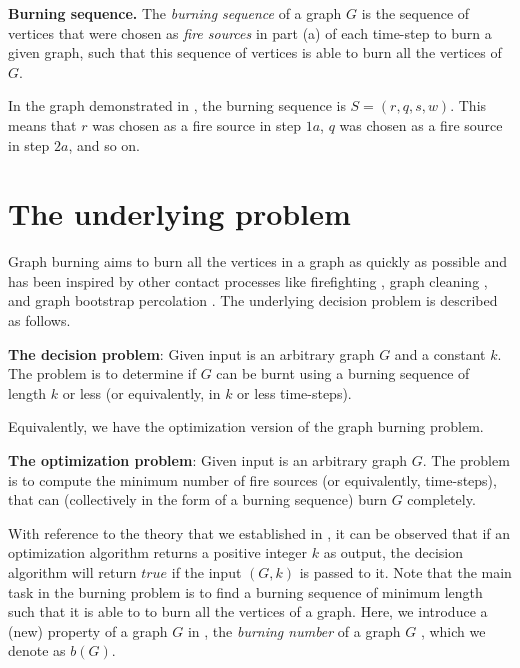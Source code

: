 \begin{definition}\label{definition:burning-sequence}
\textbf{Burning sequence.} The \textit{burning sequence} of
a graph $G$ is the sequence of vertices that were chosen as \textit{fire sources} in part (a) of each time-step to burn a given graph, such that this sequence of vertices is able to burn all the vertices of $G$.
\end{definition}

In the graph demonstrated in , the burning sequence is $S = (r, q, s, w)$. This means that $r$ was chosen as a fire source in step $1a$, $q$ was chosen as a fire source in step $2a$, and so on.

\section{The underlying problem}\label{section:burn-problem}

Graph burning aims to burn all the vertices in a graph as quickly as possible and has been inspired by other contact processes like firefighting \cite{Hartnell1995}, graph cleaning \cite{Alon2009}, and graph bootstrap percolation \cite{Balogh2012}. The underlying decision problem is described as follows.

\textbf{The decision problem}: Given input is an arbitrary graph $G$ and a constant $k$. The problem is to determine if $G$ can be burnt using a burning sequence of length $k$ or less (or equivalently, in $k$ or less time-steps).

Equivalently, we have the optimization version of the graph burning problem.

\textbf{The optimization problem}: Given input is an arbitrary graph $G$. The problem is to compute the minimum number of fire sources (or equivalently, time-steps), that can (collectively in the form of a burning sequence) burn $G$ completely.

With reference to the theory that we established in , it can be observed that if an optimization algorithm returns a positive integer $k$ as output, the decision algorithm will return $true$ if the input $(G,k)$ is passed to it. Note that the main task in the burning problem is to find a burning sequence of minimum length such that it is able to to burn all the vertices of a graph. Here, we introduce a (new) property of a graph $G$ in , the \textit{burning number} of a graph $G$ \cite{Bonato2016}, which we denote as $b(G)$.

